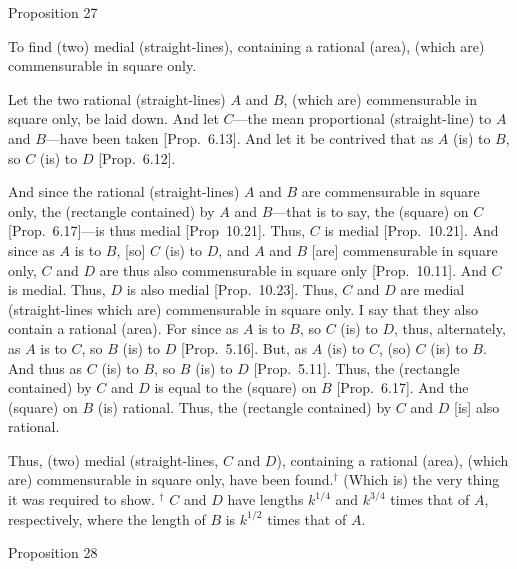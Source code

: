 
\begin{center}
{\large Proposition 27}
\end{center}

To find (two) medial (straight-lines), containing a rational (area), (which are) commensurable in square only.

\epsfysize=1.6in
\centerline{}

Let the two rational (straight-lines) $A$ and $B$, (which are) commensurable
in square only, be laid down. And let $C$---the mean proportional (straight-line) to
$A$ and $B$---have been taken [Prop.~6.13]. 
And let it be contrived that as $A$ (is) to $B$, so $C$ (is) to $D$
[Prop.~6.12].

And since the rational (straight-lines) $A$ and $B$ are commensurable in square only,  the (rectangle contained) by $A$ and $B$---that is to
say, the (square) on $C$ [Prop.~6.17]---is thus medial
[Prop~10.21]. Thus, $C$ is medial
[Prop.~10.21]. And since as $A$ is to $B$, [so]
$C$ (is) to $D$, and $A$ and $B$ [are] commensurable in square only, 
$C$ and $D$ are thus also commensurable in square only [Prop.~10.11]. And $C$ is medial.
Thus, $D$ is also medial [Prop.~10.23]. 
Thus, $C$ and $D$ are medial (straight-lines which are) commensurable
in square only. I say that they also contain a rational (area).
For since as $A$ is to $B$, so $C$ (is) to $D$, thus, alternately,
as $A$ is to $C$, so $B$ (is) to $D$ [Prop.~5.16]. 
But, as $A$ (is) to $C$, (so) $C$ (is) to $B$. 
And thus as $C$ (is) to $B$, so $B$ (is) to $D$ [Prop.~5.11].
 Thus, the (rectangle contained) by $C$ and $D$ is equal to the (square) on $B$ [Prop.~6.17]. And the (square) on $B$ (is) rational. Thus, the (rectangle contained) by $C$ and $D$ [is] also rational.
 
Thus, (two) medial (straight-lines, $C$ and $D$), containing a rational (area), (which are) commensurable in square only, have been found.$^\dag$ (Which is) the very thing it was required to show.
{\footnotesize\noindent$^\dag$ $C$ and $D$ have lengths $k^{1/4}$ and $k^{3/4}$ times that of $A$, respectively, where the length of $B$ is $k^{1/2}$ times that of $A$.}


\begin{center}
{\large Proposition 28}
\end{center}

